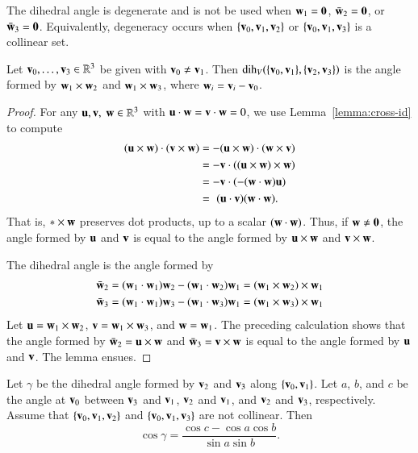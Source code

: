 The dihedral angle is degenerate and is not be used when $\w_1 =
\orz$, $\bar \w_2 = \orz$, or $\bar \w_3 = \orz$.  Equivalently, degeneracy
occurs when $\{\v_0,\v_1,\v_2\}$ or $\{\v_0,\v_1,\v_3\}$ is a collinear set.

\begin{lemma}\label{lemma:dih-cross}
  Let $\v_0,\ldots,\v_3\in\ring{R}^3$ be given with $\v_0\ne \v_1$.
  Then $\dih_V(\{\v_0,\v_1\},\{\v_2,\v_3\})$ is the angle formed by
  $\w_1\times \w_2$ and $\w_1\times \w_3$, where $\w_i= \v_i-\v_0$.
\end{lemma}

\begin{proof}  For any  $\u,\v,~\w\in\ring{R}^3$ with $\u\cdot\w=\v\cdot\w=0$, 
we use Lemma~\ref{lemma:cross-id}
to compute
\begin{align*}
  (\u\times \w)\cdot (\v\times \w) &= - (\u\times \w)\cdot (\w\times \v) \\
  &= -\v\cdot ((\u\times \w)\times \w) \\
  &= -\v\cdot (-(\w\cdot \w) \u)\\
  &= \,\,(\u\cdot \v) (\w\cdot \w).
\end{align*}
That is, $\wild\times \w$ preserves dot products, up to a scalar
$(\w\cdot\w)$.  Thus, if $\w\ne\orz$, the angle formed by $\u$ and
$\v$ is equal to the angle formed by $\u\times \w$ and $\v \times \w$.

The dihedral angle is the angle formed by
\begin{align*}
  \bar \w_2 & = (\w_1\cdot \w_1) \w_2 - (\w_1\cdot \w_2) \w_1 = (\w_1\times \w_2)\times \w_1\\
  \bar \w_3 & = (\w_1\cdot \w_1) \w_3 - (\w_1\cdot \w_3) \w_1 = (\w_1\times \w_3)\times \w_1
\end{align*}
Let $\u=\w_1\times \w_2$, $\v=\w_1\times \w_3$, and $\w=\w_1$.  The
preceding calculation shows that the angle formed by $\bar \w_2 =
\u\times\w$ and $\bar \w_3 = \v\times \w$ is equal to the angle formed
by $\u$ and $\v$.  The lemma ensues.
\end{proof}

\begin{lemma}\label{lemma:sloc}
    Let $\gamma$ be the
  dihedral angle formed by $\v_2$ and $\v_3$ along $\{\v_0,\v_1\}$.  Let
  $a$, $b$, and $c$ be the angle at $\v_0$ between $\v_3$ and $\v_1$, $\v_2$
  and $\v_1$, and $\v_2$ and $\v_3$, respectively. %
  Assume that $\{\v_0,\v_1,\v_2\}$ and $\{\v_0,\v_1,\v_3\}$ are not collinear.
  Then
  \[ \cos\gamma = \frac{\cos c - \cos a \cos b}{\sin
      a\sin b}.\] 
\end{lemma}
%
%
%

